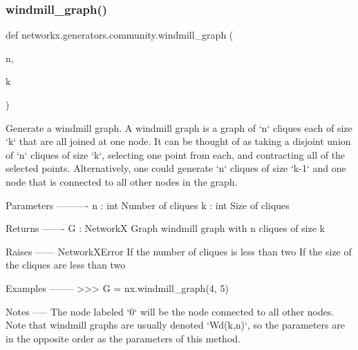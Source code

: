 \subsubsection{\texorpdfstring{windmill\+\_\+graph()}{windmill\_graph()}}
{\footnotesize\ttfamily def networkx.\+generators.\+community.\+windmill\+\_\+graph (\begin{DoxyParamCaption}\item[{}]{n,  }\item[{}]{k }\end{DoxyParamCaption})}

\begin{DoxyVerb}Generate a windmill graph.
A windmill graph is a graph of `n` cliques each of size `k` that are all
joined at one node.
It can be thought of as taking a disjoint union of `n` cliques of size `k`,
selecting one point from each, and contracting all of the selected points.
Alternatively, one could generate `n` cliques of size `k-1` and one node
that is connected to all other nodes in the graph.

Parameters
----------
n : int
    Number of cliques
k : int
    Size of cliques

Returns
-------
G : NetworkX Graph
    windmill graph with n cliques of size k

Raises
------
NetworkXError
    If the number of cliques is less than two
    If the size of the cliques are less than two

Examples
--------
>>> G = nx.windmill_graph(4, 5)

Notes
-----
The node labeled `0` will be the node connected to all other nodes.
Note that windmill graphs are usually denoted `Wd(k,n)`, so the parameters
are in the opposite order as the parameters of this method.
\end{DoxyVerb}
 